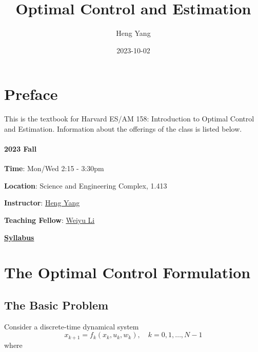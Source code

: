\documentclass[
]{book}
\title{Optimal Control and Estimation}
\author{Heng Yang}
\date{2023-10-02}
\theoremstyle{definition}
\theoremstyle{definition}
\theoremstyle{definition}
\theoremstyle{definition}
\theoremstyle{remark}
\begin{document}
\maketitle

{
\setcounter{tocdepth}{1}
\tableofcontents
}
\hypertarget{preface}{%
\chapter*{Preface}\label{preface}}

This is the textbook for Harvard ES/AM 158: Introduction to Optimal Control and Estimation. Information about the offerings of the class is listed below.

\hypertarget{fall}{%
\subsubsection*{2023 Fall}\label{fall}}

\textbf{Time}: Mon/Wed 2:15 - 3:30pm

\textbf{Location}: Science and Engineering Complex, 1.413

\textbf{Instructor}: \href{https://hankyang.seas.harvard.edu/}{Heng Yang}

\textbf{Teaching Fellow}: \href{https://scholar.harvard.edu/weiyuli/home}{Weiyu Li}

\href{https://docs.google.com/document/d/1q8_jB5dLx9jHOBi3DQ48Vv2E243ocGCGm_H0mJuOojM/edit?usp=sharing}{\textbf{Syllabus}}

\hypertarget{formulation}{%
\chapter{The Optimal Control Formulation}\label{formulation}}

\hypertarget{the-basic-problem}{%
\section{The Basic Problem}\label{the-basic-problem}}

Consider a discrete-time dynamical system
\begin{equation}
x_{k+1} = f_k (x_k, u_k, w_k), \quad k =0,1,\dots,N-1
\label{eq:discrete-time-dynamics}
\end{equation}
where
\end{document}
